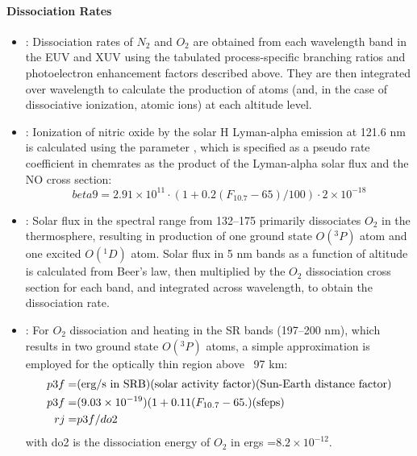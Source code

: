 \paragraph{Dissociation Rates}
\begin{itemize}
   \item {}:
       Dissociation rates of $N_2$ and $O_2$ are obtained from each wavelength 
       band in the EUV and XUV using the tabulated process-specific branching 
       ratios and photoelectron enhancement factors described above.  They 
       are then integrated over wavelength to calculate the production of 
       atoms (and, in the case of dissociative ionization, atomic ions) 
       at each altitude level.
%
    \item {}:
       Ionization of nitric oxide by the solar H Lyman-alpha emission at 
       121.6 nm is calculated using the parameter , which is specified 
       as a pseudo rate coefficient in chemrates as the product of the 
       Lyman-alpha solar flux and the NO cross section: 
       \begin{equation}
         beta9 = 2.91\times 10^{11} \cdot (1+0.2(F_{10.7}-65)/100) \cdot 2\times10^{-18}
       \end{equation}
%
     \item {}:
	Solar flux in the spectral range from 132--175 primarily dissociates 
	$O_2$ in the thermosphere, resulting in production of one ground state 
	$O(^3P)$ atom and one excited $O(^1D)$ atom.  Solar flux in 5 nm bands as a 
	function of altitude is calculated from Beer's law, then multiplied by 
	the $O_2$ dissociation cross section for each band, and integrated across 
	wavelength, to obtain the dissociation rate.
%
     \item {}:
	For $O_2$ dissociation and heating in the SR bands (197--200 nm), 
	which results in two ground state $O(^3P)$ atoms, a simple approximation 
	is employed for the optically thin region above ~97 km:
	\begin{align} 
	  p3f = & \text{(erg/s in SRB)(solar activity factor)(Sun-Earth distance factor)}   \notag \\
	  p3f = & (9.03\times10^{-19}) (1+0.11(F_{10.7}-65.) (\text{sfeps})  \notag \\
          rj  =  &p3f / do2  
	\end{align}
	with do2 is the dissociation energy of $O_2$ in ergs =$8.2\times10^{-12}$.
	
\end{itemize}
%

